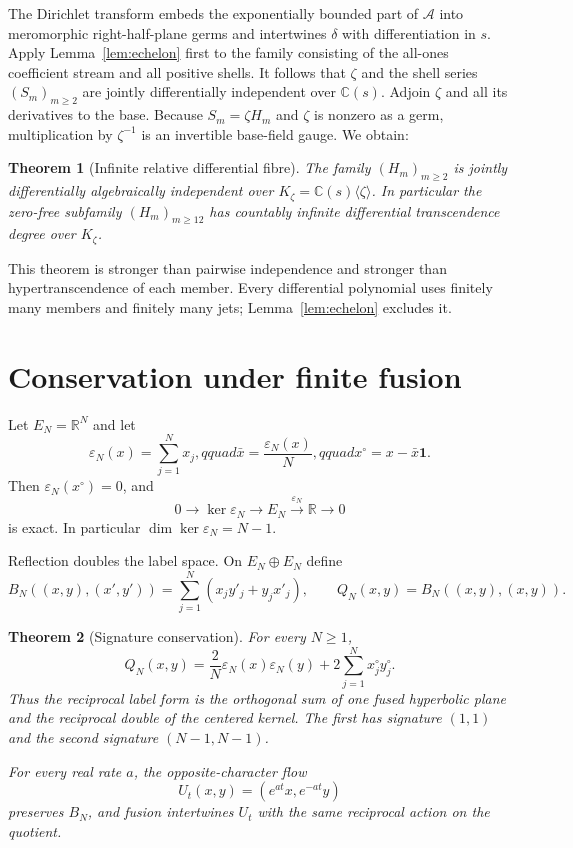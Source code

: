 \documentclass[11pt]{article}
\newtheorem{theorem}{Theorem}[section]
\theoremstyle{definition}
\theoremstyle{remark}
\newcommand{\C}{\mathbb C}
\newcommand{\R}{\mathbb R}
\newcommand{\eps}{\varepsilon}
\begin{document}
The Dirichlet transform embeds the exponentially bounded part of $\mathcal A$ into meromorphic
right-half-plane germs and intertwines $\delta$ with differentiation in $s$.  Apply
Lemma~\ref{lem:echelon} first to the family consisting of the all-ones coefficient stream and all
positive shells.  It follows that $\zeta$ and the shell series $(S_m)_{m\geq2}$ are jointly
differentially independent over $\C(s)$.  Adjoin $\zeta$ and all its derivatives to the base.
Because $S_m=\zeta H_m$ and $\zeta$ is nonzero as a germ, multiplication by $\zeta^{-1}$ is an
invertible base-field gauge.  We obtain:

\begin{theorem}[Infinite relative differential fibre]\label{thm:ht}
The family $(H_m)_{m\geq2}$ is jointly differentially algebraically independent over
$K_\zeta=\C(s)\langle\zeta\rangle$.  In particular the zero-free subfamily
$(H_m)_{m\geq12}$ has countably infinite differential transcendence degree over $K_\zeta$.
\end{theorem}

This theorem is stronger than pairwise independence and stronger than hypertranscendence of each
member.  Every differential polynomial uses finitely many members and finitely many jets;
Lemma~\ref{lem:echelon} excludes it.

\section{Conservation under finite fusion}

Let $E_N=\R^N$ and let
\[
 \eps_N(x)=\sum_{j=1}^Nx_j,qquad
 \bar x=\frac{\eps_N(x)}N,qquad
 x^\circ=x-\bar x\mathbf1.
\]
Then $\eps_N(x^\circ)=0$, and
\[
 0\longrightarrow\ker\eps_N\longrightarrow E_N
 \overset{\eps_N}{\longrightarrow}\R\longrightarrow0
 \tag{4.1}
\]
is exact.  In particular $\dim\ker\eps_N=N-1$.

Reflection doubles the label space.  On $E_N\oplus E_N$ define
\[
 B_N((x,y),(x',y'))
 =\sum_{j=1}^N(x_jy'_j+y_jx'_j),
 \qquad Q_N(x,y)=B_N((x,y),(x,y)).
 \tag{4.2}
\]

\begin{theorem}[Signature conservation]\label{thm:signature}
For every $N\geq1$,
\[
 Q_N(x,y)=\frac{2}{N}\eps_N(x)\eps_N(y)
 +2\sum_{j=1}^Nx_j^\circ y_j^\circ.
 \tag{4.3}
\]
Thus the reciprocal label form is the orthogonal sum of one fused hyperbolic plane and the
reciprocal double of the centered kernel.  The first has signature $(1,1)$ and the second
signature $(N-1,N-1)$.

For every real rate $a$, the opposite-character flow
\[
 U_t(x,y)=(e^{at}x,e^{-at}y)
 \tag{4.4}
\]
preserves $B_N$, and fusion intertwines $U_t$ with the same reciprocal action on the quotient.
\end{theorem}
\end{document}
